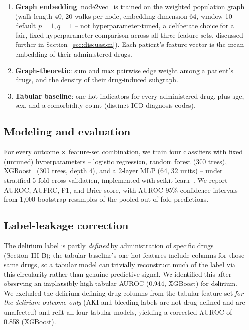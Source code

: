 \documentclass[conference]{IEEEtran}
\begin{document}
\begin{enumerate}
\item \textbf{Graph embedding}: node2vec~\cite{grover2016node2vec} is trained
  on the weighted population graph (walk length 40, 20 walks per node,
  embedding dimension 64, window 10, default $p{=}1,q{=}1$ -- not
  hyperparameter-tuned, a deliberate choice for a fair, fixed-hyperparameter
  comparison across all three feature sets, discussed further in
  Section~\ref{sec:discussion}). Each patient's feature vector is the mean
  embedding of their administered drugs.
\item \textbf{Graph-theoretic}: sum and max pairwise edge weight among a
  patient's drugs, and the density of their drug-induced subgraph.
\item \textbf{Tabular baseline}: one-hot indicators for every administered
  drug, plus age, sex, and a comorbidity count (distinct ICD diagnosis
  codes).
\end{enumerate}

\subsection{Modeling and evaluation}

For every outcome $\times$ feature-set combination, we train four
classifiers with fixed (untuned) hyperparameters -- logistic regression,
random forest (300 trees), XGBoost~\cite{chen2016xgboost} (300 trees, depth
4), and a 2-layer MLP (64, 32 units) -- under stratified 5-fold
cross-validation, implemented with
scikit-learn~\cite{pedregosa2011scikitlearn}. We report AUROC, AUPRC, F1,
and Brier score, with AUROC 95\% confidence intervals from 1{,}000 bootstrap
resamples of the pooled out-of-fold predictions.

\subsection{Label-leakage correction}

The delirium label is partly \emph{defined} by administration of specific
drugs (Section~III-B); the tabular baseline's one-hot features include
columns for those same drugs, so a tabular model can trivially reconstruct
much of the label via this circularity rather than genuine predictive
signal. We identified this after observing an implausibly high tabular
AUROC (0.944, XGBoost) for delirium. We excluded the delirium-defining drug
columns from the tabular feature set \emph{for the delirium outcome only}
(AKI and bleeding labels are not drug-defined and are unaffected) and refit
all four tabular models, yielding a corrected AUROC of 0.858 (XGBoost).
\end{document}
